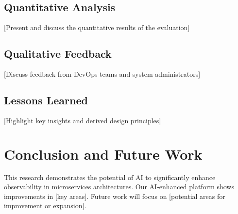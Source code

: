\documentclass[10pt,journal,compsoc]{IEEEtran}
\begin{document}
\subsection{Quantitative Analysis}
[Present and discuss the quantitative results of the evaluation]

\subsection{Qualitative Feedback}
[Discuss feedback from DevOps teams and system administrators]

\subsection{Lessons Learned}
[Highlight key insights and derived design principles]

\section{Conclusion and Future Work}
This research demonstrates the potential of AI to significantly enhance observability in microservices architectures. Our AI-enhanced platform shows improvements in [key areas]. Future work will focus on [potential areas for improvement or expansion].



\end{document}
